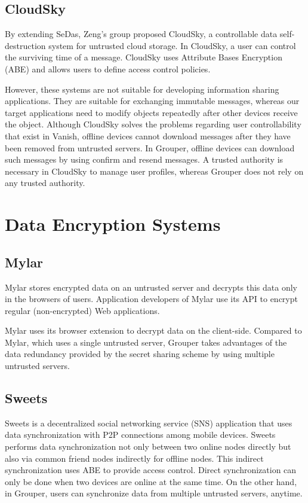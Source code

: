 \documentclass[a4paper,11pt]{report}
\begin{document}
\subsection{CloudSky}
By extending SeDas, Zeng's group proposed CloudSky\cite{zeng2015cloudsky}, a controllable data self-destruction system for untrusted cloud storage. 
In CloudSky, a user can control the surviving time of a message.
CloudSky uses Attribute Bases Encryption (ABE) and allows users to define access control policies.

However, these systems are not suitable for developing information sharing applications. 
They are suitable for exchanging immutable messages, whereas our target applications need to modify objects repeatedly after other devices receive the object. 
Although CloudSky solves the problems regarding user controllability that exist in Vanish, offline devices cannot download messages after they have been removed from untrusted servers.
In Grouper, offline devices can download such messages by using confirm and resend messages.
A trusted authority is necessary in CloudSky to manage user profiles, whereas Grouper does not rely on any trusted authority.

\section{Data Encryption Systems}



\subsection{Mylar}
Mylar\cite{popa2014building} stores encrypted data on an untrusted server and decrypts this data only in the browsers of users. 
Application developers of Mylar use its API to encrypt regular (non-encrypted) Web applications. 

Mylar uses its browser extension to decrypt data on the client-side. 
Compared to Mylar, which uses a single untrusted server, Grouper takes advantages of the data redundancy provided by the secret sharing scheme by using multiple untrusted servers.

\subsection{Sweets}
Sweets\cite{sweets} is a decentralized social networking service (SNS) application that uses data synchronization with P2P connections among mobile devices. 
Sweets performs data synchronization not only between two online nodes directly but also via common friend nodes indirectly for offline nodes.
This indirect synchronization uses ABE to provide access control.
Direct synchronization can only be done when two devices are online at the same time. 
On the other hand, in Grouper, users can synchronize data from multiple untrusted servers, anytime.
\end{document}
